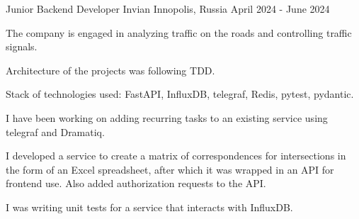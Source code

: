 

\begin{cventries}

  \cventry
    {Junior Backend Developer} %
    {Invian} %
    {Innopolis, Russia} %
    {April 2024 - June 2024} %
    {
      \begin{cvitems} %
        \item {The company is engaged in analyzing traffic on the roads and controlling traffic signals. }
        \item {Architecture of the projects was following TDD. }
        \item {Stack of technologies used: FastAPI, InfluxDB, telegraf, Redis, pytest, pydantic. }
        \item {I have been working on adding recurring tasks to an existing service using telegraf and Dramatiq. }
        \item {I developed a service to create a matrix of correspondences for intersections in the form of an Excel spreadsheet, after which it was wrapped in an API for frontend use. Also added authorization requests to the API. }
        \item {I was writing unit tests for a service that interacts with InfluxDB.}
      \end{cvitems}
    }
\end{cventries}
